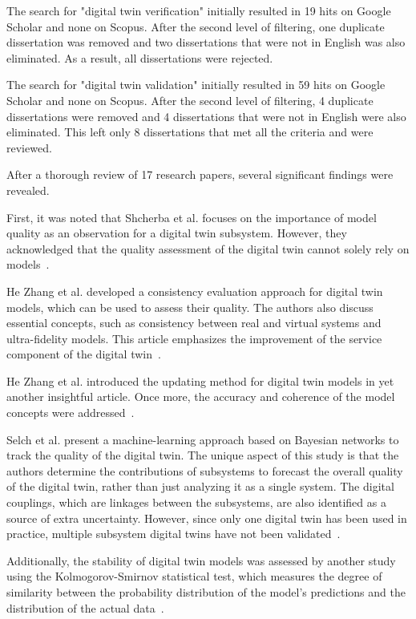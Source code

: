 \documentclass{llncs}
\begin{document}
    The search for "digital twin verification" initially resulted in 19 hits on Google Scholar and none on Scopus. 
    After the second level of filtering, one duplicate dissertation was removed and two dissertations that were not in 
    English was also eliminated. As a result, all dissertations were rejected.

    The search for "digital twin validation" initially resulted in 59 hits on Google Scholar and none on Scopus. 
    After the second level of filtering, 4 duplicate dissertations were removed and 4 
    dissertations that were not in English were also eliminated. This left only 8 dissertations that met all the criteria and were reviewed.
    
    After a thorough review of 17 research papers, several significant findings were revealed.
    
    First, it was noted that Shcherba et al. focuses on the importance of model quality as an observation for a digital twin subsystem. 
    However, they acknowledged that the quality assessment of the digital twin cannot solely rely on models~\cite{Shcherba}. 

    He Zhang et al. developed a consistency evaluation approach for digital twin models, which can be used to assess their quality. 
    The authors also discuss essential concepts, such as consistency between real and virtual systems and ultra-fidelity models. 
    This article emphasizes the improvement of the service component of the digital twin~\cite{ZHANGEVALUATIONMETHOD}.

    He Zhang et al. introduced the updating method for digital twin models in yet another insightful article.
    Once more, the accuracy and coherence of the model concepts were addressed~\cite{ZHANGUPDATEMETHOD}.

    Selch et al. present a machine-learning approach based on Bayesian networks to track the quality of the digital twin. 
    The unique aspect of this study is that the authors determine the contributions of subsystems to forecast the overall quality of the digital twin, 
    rather than just analyzing it as a single system. The digital couplings, which are linkages between the subsystems, are also identified as a source of extra uncertainty. 
    However, since only one digital twin has been used in practice, multiple subsystem digital twins have not been validated~\cite{QualityMonitoringofCoupledDigitalTwins}.

    Additionally, the stability of digital twin models was assessed by another study using the Kolmogorov-Smirnov statistical test, 
    which measures the degree of similarity between the probability distribution of the model's predictions and the distribution of the actual data~\cite{RadarDigitalTwin}.
\end{document}
